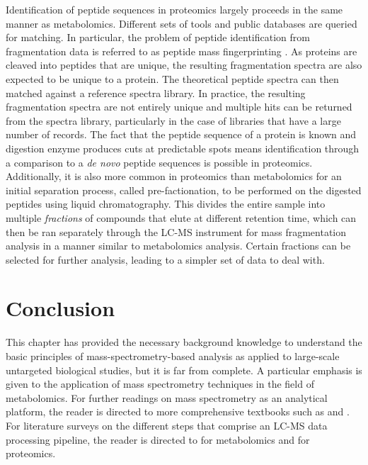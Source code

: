 Identification of peptide sequences in proteomics largely proceeds in the same manner as metabolomics. Different sets of tools and public databases are queried for matching. In particular, the problem of peptide identification from fragmentation data is referred to as peptide mass fingerprinting \cite{Sandin2014}. As proteins are cleaved into peptides that are unique, the resulting fragmentation spectra are also expected to be unique to a protein. The theoretical peptide spectra can then matched against a reference spectra library. In practice, the resulting fragmentation spectra are not entirely unique and multiple hits can be returned from the spectra library, particularly in the case of libraries that have a large number of records. The fact that the peptide sequence of a protein is known and digestion enzyme produces cuts at predictable spots means identification through a comparison to a \textit{de novo} peptide sequences is possible in proteomics. Additionally, it is also more common in proteomics than metabolomics for an initial separation process, called pre-factionation, to be performed on the digested peptides using liquid chromatography. This divides the entire sample into multiple \emph{fractions} of compounds that elute at different retention time, which can then be ran separately through the LC-MS instrument for mass fragmentation analysis in a manner similar to metabolomics analysis. Certain fractions can be selected for further analysis, leading to a simpler set of data to deal with.

\section{Conclusion}

This chapter has provided the necessary background knowledge to understand the basic principles of mass-spectrometry-based analysis as applied to large-scale untargeted biological studies, but it is far from complete. A particular emphasis is given to the application of mass spectrometry techniques in the field of metabolomics. For further readings on mass spectrometry as an analytical platform, the reader is directed to more comprehensive textbooks such as \cite{Hoffmann2007} and \cite{gross2006mass}. For literature surveys on the different steps that comprise an LC-MS data processing pipeline, the reader is directed to \cite{Castillo2011,Smith2014,Gika2014,Alonso2015} for metabolomics and \cite{Sandin2014, Megger2013, Smith2014} for proteomics. 

